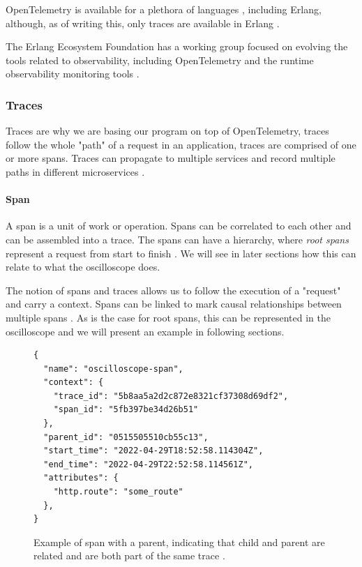    OpenTelemetry is available for a plethora of languages \cite{otel-l}, including Erlang, although, as of writing this, only traces are available in Erlang \cite{otel-in}.
     
    The Erlang Ecosystem Foundation has a working group focused on evolving the tools related to observability, including OpenTelemetry and the runtime observability monitoring tools \cite{obs-group}. 
    
    \subsubsection{Traces}
        Traces are why we are basing our program on top of OpenTelemetry, traces follow the whole "path" of a request in an application, traces are comprised of one or more spans. Traces can propagate to multiple services and record multiple paths in different microservices \cite{otel-dt}. 
        
        \paragraph{Span} A span is a unit of work or operation. Spans can be correlated to each other and can be assembled into a trace. The spans can have a hierarchy, where \textit{root spans} represent a request from start to finish \cite{otel-dt}. We will see in later sections how this can relate to what the oscilloscope does.

    The notion of spans and traces allows us to follow the execution of a "request" and carry a context. Spans can be linked to mark causal relationships between multiple spans \cite{otel-t}. As is the case for root spans, this can be represented in the oscilloscope and we will present an example in following sections.
    \begin{figure}[H]
    \begin{verbatim} 
{
  "name": "oscilloscope-span",
  "context": {
    "trace_id": "5b8aa5a2d2c872e8321cf37308d69df2",
    "span_id": "5fb397be34d26b51"
  },
  "parent_id": "0515505510cb55c13",
  "start_time": "2022-04-29T18:52:58.114304Z",
  "end_time": "2022-04-29T22:52:58.114561Z",
  "attributes": {
    "http.route": "some_route"
  },
}
    \end{verbatim}

    \caption{Example of span with a parent, indicating that child and parent are related and are both part of the same trace \cite{otel-t}.}

    \end{figure}

